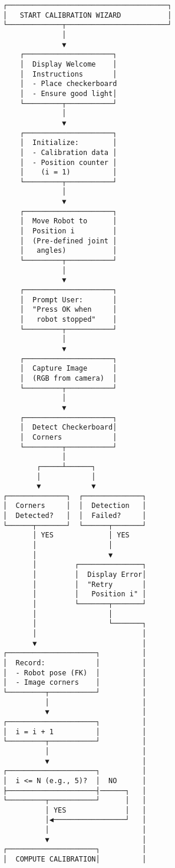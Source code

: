 \documentclass[
]{article}
\begin{document}
\begin{verbatim}
┌──────────────────────────────────────┐
│   START CALIBRATION WIZARD           │
└─────────────┬────────────────────────┘
              │
              ▼
    ┌─────────────────────┐
    │  Display Welcome    │
    │  Instructions       │
    │  - Place checkerboard
    │  - Ensure good light│
    └─────────┬───────────┘
              │
              ▼
    ┌─────────────────────┐
    │  Initialize:        │
    │  - Calibration data │
    │  - Position counter │
    │    (i = 1)          │
    └─────────┬───────────┘
              │
              ▼
    ┌─────────────────────┐
    │  Move Robot to      │
    │  Position i         │
    │  (Pre-defined joint │
    │   angles)           │
    └─────────┬───────────┘
              │
              ▼
    ┌─────────────────────┐
    │  Prompt User:       │
    │  "Press OK when     │
    │   robot stopped"    │
    └─────────┬───────────┘
              │
              ▼
    ┌─────────────────────┐
    │  Capture Image      │
    │  (RGB from camera)  │
    └─────────┬───────────┘
              │
              ▼
    ┌─────────────────────┐
    │  Detect Checkerboard│
    │  Corners            │
    └─────────┬───────────┘
              │
        ┌─────┴──────┐
        │            │
        ▼            ▼
┌──────────────┐  ┌──────────────┐
│  Corners     │  │  Detection   │
│  Detected?   │  │  Failed?     │
└──────┬───────┘  └──────┬───────┘
       │ YES             │ YES
       │                 │
       │                 ▼
       │         ┌───────────────┐
       │         │  Display Error│
       │         │  "Retry       │
       │         │   Position i" │
       │         └───────┬───────┘
       │                 │
       │                 └───────┐
       │                         │
       ▼                         │
┌─────────────────────┐          │
│  Record:            │          │
│  - Robot pose (FK)  │          │
│  - Image corners    │          │
└─────────┬───────────┘          │
          │                      │
          ▼                      │
┌─────────────────────┐          │
│  i = i + 1          │          │
└─────────┬───────────┘          │
          │                      │
          ▼                      │
┌─────────────────────┐          │
│  i <= N (e.g., 5)?  │  NO      │
├─────────────────────┤──────┐   │
└─────────┬───────────┘      │   │
          │ YES              │   │
          │◀─────────────────┘   │
          │                      │
          ▼                      │
┌─────────────────────┐          │
│  COMPUTE CALIBRATION│          │

\end{verbatim}
\end{document}
